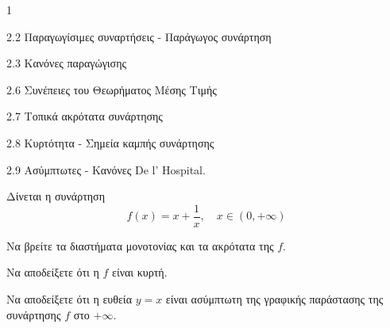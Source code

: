 \begin{ylh}{1}
    \item 2.2 Παραγωγίσιμες συναρτήσεις - Παράγωγος συνάρτηση
    \item 2.3 Κανόνες παραγώγισης
    \item 2.6 Συνέπειες του Θεωρήματος Μέσης Τιμής
    \item 2.7 Τοπικά ακρότατα συνάρτησης
    \item 2.8 Κυρτότητα - Σημεία καμπής συνάρτησης
    \item 2.9 Ασύμπτωτες - Κανόνες De l’ Hospital.
\end{ylh}
Δίνεται η συνάρτηση
\[ f(x) = x + \frac{1}{x}, \quad x \in (0, +\infty) \]
\begin{alist}
\item Να βρείτε τα διαστήματα μονοτονίας και τα ακρότατα της $f$. 
\item Να αποδείξετε ότι η $f$ είναι κυρτή. 
\item Να αποδείξετε ότι η ευθεία $y = x$ είναι ασύμπτωτη της γραφικής παράστασης της συνάρτησης $f$ στο $+\infty$. 
\end{alist}